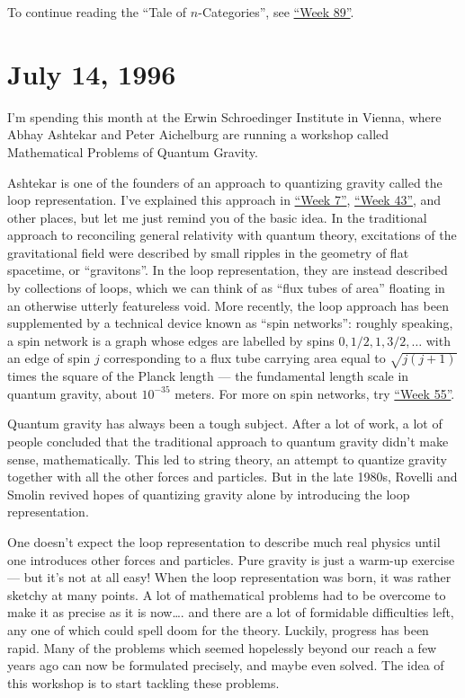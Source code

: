 \documentclass{article}
\begin{document}
To continue reading the ``Tale of \(n\)-Categories'', see
\protect\hyperlink{week89}{``Week 89''}.
\hypertarget{week85}{%
\section{July 14, 1996}\label{week85}}

I'm spending this month at the Erwin Schroedinger Institute in Vienna,
where Abhay Ashtekar and Peter Aichelburg are running a workshop called
Mathematical Problems of Quantum Gravity.

Ashtekar is one of the founders of an approach to quantizing gravity
called the loop representation. I've explained this approach in
\protect\hyperlink{week7}{``Week 7''}, \protect\hyperlink{week43}{``Week
43''}, and other places, but let me just remind you of the basic idea.
In the traditional approach to reconciling general relativity with
quantum theory, excitations of the gravitational field were described by
small ripples in the geometry of flat spacetime, or ``gravitons''. In
the loop representation, they are instead described by collections of
loops, which we can think of as ``flux tubes of area'' floating in an
otherwise utterly featureless void. More recently, the loop approach has
been supplemented by a technical device known as ``spin networks'':
roughly speaking, a spin network is a graph whose edges are labelled by
spins \(0,1/2,1,3/2,\ldots\) with an edge of spin \(j\) corresponding to
a flux tube carrying area equal to \(\sqrt{j(j+1)}\) times the square of
the Planck length --- the fundamental length scale in quantum gravity,
about \(10^{-35}\) meters. For more on spin networks, try
\protect\hyperlink{week55}{``Week 55''}.

Quantum gravity has always been a tough subject. After a lot of work, a
lot of people concluded that the traditional approach to quantum gravity
didn't make sense, mathematically. This led to string theory, an attempt
to quantize gravity together with all the other forces and particles.
But in the late 1980s, Rovelli and Smolin revived hopes of quantizing
gravity alone by introducing the loop representation.

One doesn't expect the loop representation to describe much real physics
until one introduces other forces and particles. Pure gravity is just a
warm-up exercise --- but it's not at all easy! When the loop
representation was born, it was rather sketchy at many points. A lot of
mathematical problems had to be overcome to make it as precise as it is
now\ldots. and there are a lot of formidable difficulties left, any one
of which could spell doom for the theory. Luckily, progress has been
rapid. Many of the problems which seemed hopelessly beyond our reach a
few years ago can now be formulated precisely, and maybe even solved.
The idea of this workshop is to start tackling these problems.
\end{document}
